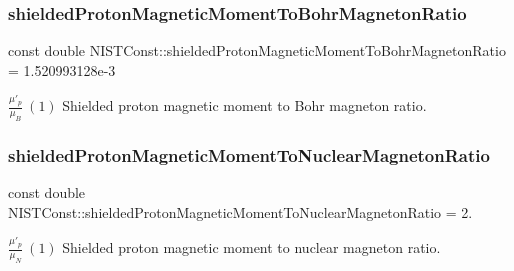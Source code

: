 \subsubsection{\texorpdfstring{shielded\+Proton\+Magnetic\+Moment\+To\+Bohr\+Magneton\+Ratio}{shieldedProtonMagneticMomentToBohrMagnetonRatio}}
{\footnotesize\ttfamily const double N\+I\+S\+T\+Const\+::shielded\+Proton\+Magnetic\+Moment\+To\+Bohr\+Magneton\+Ratio = 1.\+520993128e-\/3}

$\frac{\mu'_p}{\mu_B} \ (1)$ Shielded proton magnetic moment to Bohr magneton ratio. \mbox{\label{group___n_i_s_t_const-_proton_ga03e84ef0d1452fa7c647f8866913fbc3}} 
\subsubsection{\texorpdfstring{shielded\+Proton\+Magnetic\+Moment\+To\+Nuclear\+Magneton\+Ratio}{shieldedProtonMagneticMomentToNuclearMagnetonRatio}}
{\footnotesize\ttfamily const double N\+I\+S\+T\+Const\+::shielded\+Proton\+Magnetic\+Moment\+To\+Nuclear\+Magneton\+Ratio = 2.}

$\frac{\mu'_p}{\mu_N} \ (1)$ Shielded proton magnetic moment to nuclear magneton ratio. 